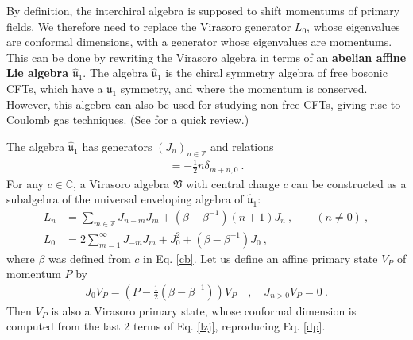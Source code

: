 \documentclass[12pt, a4paper]{article}
\newcommand{\myindex}[1]{\textbf{\boldmath #1}}
\begin{document}
By definition, the interchiral algebra is supposed to shift momentums of primary fields. We therefore need to replace the Virasoro generator $L_0$, whose eigenvalues are conformal dimensions, with a generator whose eigenvalues are momentums. This can be done by rewriting the Virasoro algebra in terms of an \myindex{abelian affine Lie algebra $\hat{\mathfrak{u}}_1$}. The algebra $\hat{\mathfrak{u}}_1$ is the chiral symmetry algebra of free bosonic CFTs, which have a $\mathfrak{u}_1$ symmetry, and where the momentum is conserved. 
However, this algebra can also be used for studying non-free CFTs, giving rise to Coulomb gas techniques. (See \cite[Section 4.1]{rib14} for a quick review.)

The algebra $\hat{\mathfrak{u}}_1$ has generators $(J_n)_{n\in\mathbb{Z}}$ and relations 
\begin{align}
 [J_m,J_n] = -\frac12 n\delta_{m+n,0}\ . 
\end{align}
For any $c\in\mathbb{C}$, a Virasoro algebra $\mathfrak{V}$ with central charge $c$ can be constructed as a subalgebra of the universal enveloping algebra of $\hat{\mathfrak{u}}_1$:
\begin{subequations}
\begin{align}
 L_n &= \sum_{m\in{\mathbb{Z}}} J_{n-m}J_m + \left(\beta-\beta^{-1}\right)(n+1)J_n\ , \qquad (n\neq 0)\ ,
\label{lnj}
\\
L_0 &=2\sum_{m=1}^\infty J_{-m}J_m +J_0^2+\left(\beta-\beta^{-1}\right)J_0 \ ,
\label{lzj}
\end{align}
\end{subequations}
where $\beta$ was defined from $c$ in Eq. \eqref{cb}. Let us define an affine primary state $V_P$ of momentum $P$ by 
\begin{align}
 J_0 V_P  = \left(P-\tfrac12\left(\beta-\beta^{-1}\right) \right) V_P \quad , \quad J_{n>0} V_P = 0\ .
\end{align}
Then $V_P$ is also a Virasoro primary state, whose conformal dimension is computed from the last 2 terms of Eq. \eqref{lzj}, reproducing Eq. \eqref{dp}. 
\end{document}
